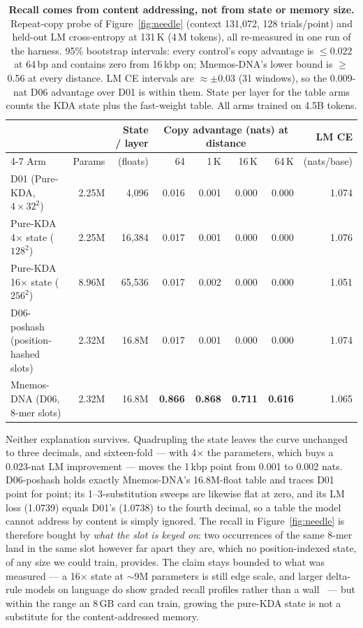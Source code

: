 \documentclass[11pt]{article}
\theoremstyle{plain}
\newcommand{\best}[1]{\textbf{#1}}
\begin{document}
\begin{table}[!tbp]
\centering\small
\begin{tabular}{lrrrrrrr}
\toprule
& & State / layer & \multicolumn{4}{c}{Copy advantage (nats) at distance} & LM CE \\
\cmidrule(lr){4-7}
Arm & Params & (floats) & 64 & 1\,K & 16\,K & 64\,K & (nats/base) \\
\midrule
D01 (Pure-KDA, $4{\times}32^2$) & 2.25M & 4{,}096 & 0.016 & 0.001 & 0.000 & 0.000 & 1.074 \\
Pure-KDA 4$\times$ state ($128^2$) & 2.25M & 16{,}384 & 0.017 & 0.001 & 0.000 & 0.000 & 1.076 \\
Pure-KDA 16$\times$ state ($256^2$) & 8.96M & 65{,}536 & 0.017 & 0.002 & 0.000 & 0.000 & 1.051 \\
D06-poshash (position-hashed slots) & 2.32M & 16.8M & 0.017 & 0.001 & 0.000 & 0.000 & 1.074 \\
\midrule
Mnemos-DNA (D06, 8-mer slots) & 2.32M & 16.8M & \best{0.866} & \best{0.868} & \best{0.711} & \best{0.616} & 1.065 \\
\bottomrule
\end{tabular}
\caption{\textbf{Recall comes from content addressing, not from state or memory size.} Repeat-copy
probe of Figure~\ref{fig:needle} (context 131{,}072, 128 trials/point) and held-out LM
cross-entropy at 131\,K (4\,M tokens), all re-measured in one run of the harness. 95\% bootstrap
intervals: every control's copy advantage is $\le$0.022 at 64\,bp and contains zero from 16\,kbp
on; Mnemos-DNA's lower bound is $\ge$0.56 at every distance. LM CE intervals are $\approx\pm$0.03
(31 windows), so the 0.009-nat D06 advantage over D01 is within them. State per layer for the
table arms counts the KDA state plus the fast-weight table. All arms trained on 4.5B tokens.}
\label{tab:controls}
\end{table}

Neither explanation survives. Quadrupling the state leaves the curve unchanged to three decimals,
and sixteen-fold --- with 4$\times$ the parameters, which buys a 0.023-nat LM improvement --- moves
the 1\,kbp point from 0.001 to 0.002 nats. D06-poshash holds exactly Mnemos-DNA's 16.8M-float
table and traces D01 point for point; its 1--3-substitution sweeps are likewise flat at zero, and
its LM loss (1.0739) equals D01's (1.0738) to the fourth decimal, so a table the model cannot
address by content is simply ignored. The recall in Figure~\ref{fig:needle} is therefore bought
by \emph{what the slot is keyed on}: two occurrences of the same 8-mer land in the same slot
however far apart they are, which no position-indexed state, of any size we could train, provides.
The claim stays bounded to what was measured --- a 16$\times$ state at $\sim$9M parameters is still
edge scale, and larger delta-rule models on language do show graded recall profiles rather than a
wall~\cite{arora2023zoology,yang2025gated} --- but within the range an 8\,GB card can train, growing
the pure-KDA state is not a substitute for the content-addressed memory.
\end{document}
